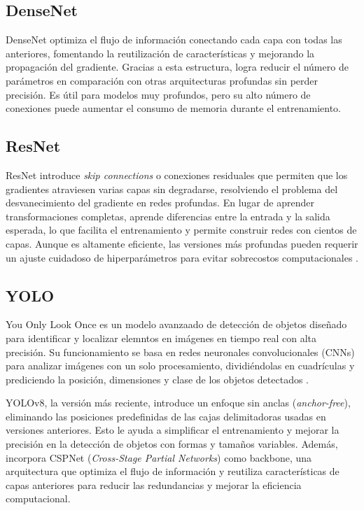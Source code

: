 \subsection{DenseNet}
DenseNet optimiza el flujo de información conectando cada capa con todas las anteriores,
fomentando la reutilización de características y mejorando la propagación del gradiente.
Gracias a esta estructura, logra reducir el número de parámetros en comparación con otras
arquitecturas profundas sin perder precisión. Es útil para modelos muy profundos, pero su
alto número de conexiones puede aumentar el consumo de memoria durante el entrenamiento.

\subsection{ResNet}
ResNet introduce \textit{skip connections} o conexiones residuales que permiten que
los gradientes atraviesen varias capas sin degradarse, resolviendo el problema del
desvanecimiento del gradiente en redes profundas. En lugar de aprender transformaciones
completas, aprende diferencias entre la entrada y la salida esperada, lo que facilita
el entrenamiento y permite construir redes con cientos de capas. Aunque es altamente
eficiente, las versiones más profundas pueden requerir un ajuste cuidadoso de
hiperparámetros para evitar sobrecostos computacionales \cite{sathishkumar_forest_2023}.

\subsection{YOLO}
You Only Look Once es un modelo avanzaado de detección de objetos diseñado para identificar
y localizar elemntos en imágenes en tiempo real con alta precisión. Su funcionamiento se
basa en redes neuronales convolucionales (CNNs) para analizar imágenes con un solo
procesamiento, dividiéndolas en cuadrículas y prediciendo la posición, dimensiones y
clase de los objetos detectados \cite{yaseen2024yolov8indepthexplorationinternal}.

YOLOv8, la versión más reciente, introduce un enfoque sin anclas (\textit{anchor-free}),
eliminando las posiciones predefinidas de las cajas delimitadoras usadas en versiones
anteriores. Esto le ayuda a simplificar el entrenamiento y mejorar la precisión en la
detección de objetos con formas y tamaños variables. Además, incorpora CSPNet
(\textit{Cross-Stage Partial Networks}) como backbone, una arquitectura que optimiza el
flujo de información y reutiliza características de capas anteriores para reducir las
redundancias y mejorar la eficiencia computacional.

